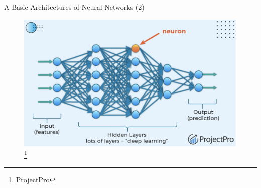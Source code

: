 \documentclass[10pt, hyperref={colorlinks = true,linkcolor = blue}]{beamer}
\begin{document}
{{\begin{frame}{A Basic Architectures of Neural Networks (2)}
\begin{figure}
\includegraphics[width=\linewidth]{figures/NNs_pictures}\footnote{\href{https://www.projectpro.io/article/deep-learning-architectures/996}{ProjectPro}}
\end{figure}
\end{frame}

{
}}}
\end{document}

